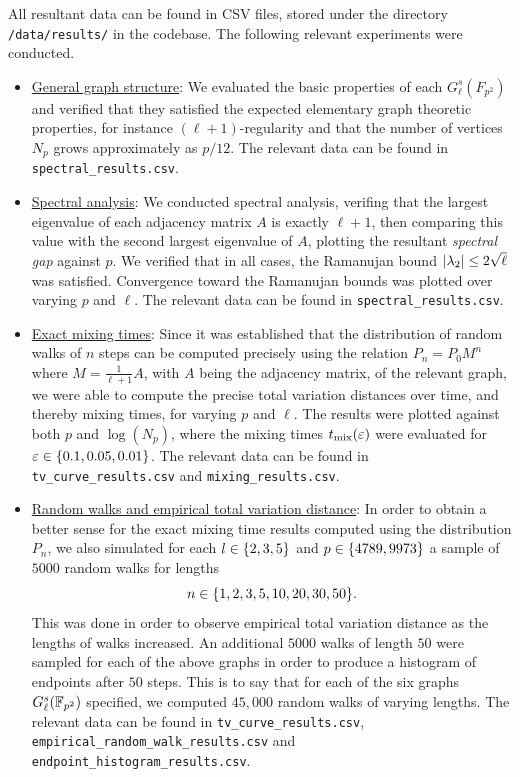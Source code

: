     All resultant data can be found in CSV files, stored under the directory \verb|/data/results/| in the codebase. The following relevant experiments were conducted.
    \begin{itemize}
        \item 
            \underline{General graph structure}: We evaluated the basic properties of each $G_\ell^s(F_{p^2})$ and verified that they satisfied the expected elementary graph theoretic properties, for instance $(\ell+1)$-regularity and that the number of vertices $N_p$ grows approximately as $p/12$. The relevant data can be found in \verb|spectral_results.csv|.
        \item 
            \underline{Spectral analysis}: We conducted spectral analysis, verifing that the largest eigenvalue of each adjacency matrix $A$ is exactly $\ell+1$, then comparing this value with the second largest eigenvalue of $A$, plotting the resultant \textit{spectral gap} against $p$. We verified that in all cases, the Ramanujan bound $\left\lvert\lambda_2\right\rvert \leq 2 \sqrt{\ell}$ was satisfied. Convergence toward the Ramanujan bounds was plotted over varying $p$ and $\ell$. The relevant data can be found in \verb|spectral_results.csv|.
        \item 
            \underline{Exact mixing times}: Since it was established that the distribution of random walks of $n$ steps can be computed precisely using the relation $P_n = P_0 M^n$ where $M = \frac{1}{\ell + 1}A$, with $A$ being the adjacency matrix, of the relevant graph, we were able to compute the precise total variation distances over time, and thereby mixing times, for varying $p$ and $\ell$. The results were plotted against both $p$ and $\log(N_p)$, where the mixing times $t_{\operatorname{mix}}(\varepsilon)$ were evaluated for $\varepsilon \in \left\{0.1, 0.05, 0.01\right\}$. The relevant data can be found in \verb|tv_curve_results.csv| and \verb|mixing_results.csv|.
        \item 
            \underline{Random walks and empirical total variation distance}: In order to obtain a better sense for the exact mixing time results computed using the distribution $P_n$, we also simulated for each $l \in \left\{2,3,5\right\}$ and $p \in \left\{4789, 9973\right\}$ a sample of $5000$ random walks for lengths 
            \begin{equation*}
                n \in \curly{1, 2, 3, 5, 10, 20, 30, 50}.
            \end{equation*}
            This was done in order to observe empirical total variation distance as the lengths of walks increased. An additional $5000$ walks of length $50$ were sampled for each of the above graphs in order to produce a histogram of endpoints after $50$ steps. This is to say that for each of the six graphs $G_\ell^s(\mathbb{F}_{p^2})$ specified, we computed $45,000$ random walks of varying lengths. The relevant data can be found in \verb|tv_curve_results.csv|, \verb|empirical_random_walk_results.csv| and \verb|endpoint_histogram_results.csv|.


\end{itemize}

